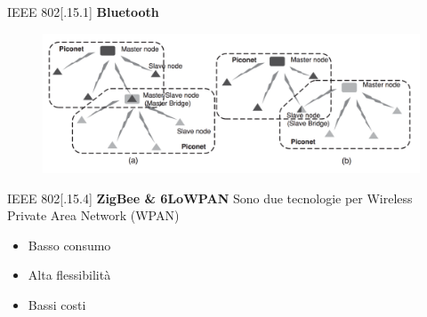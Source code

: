 
\begin{frame}{IEEE 802[.15.1]}
\textbf{Bluetooth}
	\begin{figure}[h] 
		\includegraphics[scale=0.3,cfbox=blue_slides 1pt 0pt]{imgs/bt.png}
	\end{figure}
\end{frame}

\begin{frame}{IEEE 802[.15.4]}
\textbf{ZigBee \& 6LoWPAN}
	\newline
	Sono due tecnologie per Wireless Private Area Network (WPAN)
	\begin{itemize}[<+- | alert@+>]
		\item Basso consumo
		\item Alta flessibilità
		\item Bassi costi
	\end{itemize}
\end{frame}

